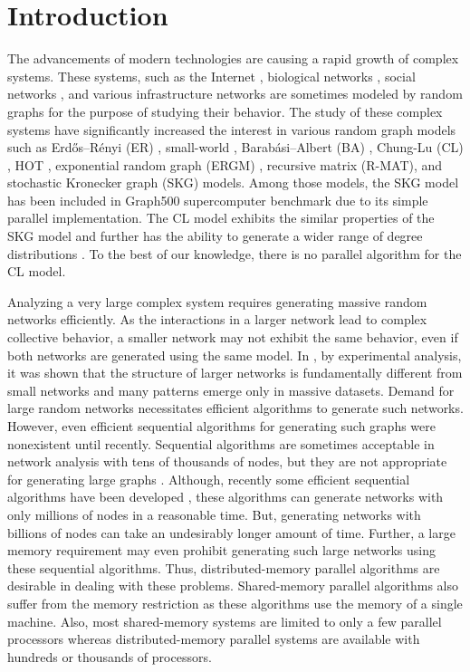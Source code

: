 \documentclass[conference,letterpaper,10pt]{IEEEtran}
\begin{document}
\IEEEpeerreviewmaketitle

\section{Introduction}
The advancements of modern technologies are causing a rapid growth of  complex systems. 
These systems, such as the Internet \cite{Siganos2003}, biological networks \cite{Girvan2002}, social networks \cite{Yang2011,Yang2012}, and various infrastructure networks \cite{Latora2005,Chassin2005}  are sometimes modeled by random graphs for the purpose of studying their behavior.
The study of these complex systems have significantly increased the interest in various random graph models such as Erd\H{o}s--R\'enyi (ER) \cite{Erdos1960}, small-world \cite{Watts1998}, Barab\'{a}si--Albert (BA) \cite{Barabasi1999}, Chung-Lu (CL) \cite{Chung2002}, HOT \cite{Carlson1999}, exponential random graph (ERGM) \cite{Robins2007}, recursive matrix (R-MAT)\cite{Chakrabarti2004}, and stochastic Kronecker graph (SKG) \cite{Leskovec2007,Leskovec2010} models. Among those models, the SKG model has been included in Graph500 supercomputer benchmark \cite{Graph500} due to its simple parallel implementation. The CL model exhibits the similar properties of the SKG model and further has the ability to generate a wider range of degree distributions \cite{Pinar2012}. To the best of our knowledge, there is no parallel algorithm for the CL model.

Analyzing a very large complex system requires generating massive random networks efficiently. As the interactions in a larger network lead to complex collective behavior, a smaller network may not exhibit the same behavior, even if both networks are generated using the same model. In \cite{Leskovec2008}, by experimental analysis, it was shown that the structure of larger networks is fundamentally different from small networks and many patterns emerge only in massive datasets.
Demand for large random networks necessitates efficient algorithms to generate such networks. However, even efficient sequential algorithms for generating such graphs were nonexistent until recently. 
Sequential algorithms are sometimes acceptable in network analysis with tens of thousands of nodes, but they are not appropriate for generating large graphs \cite{Batagelj2005}.
Although, recently some efficient sequential algorithms have been developed \cite{Chakrabarti2004,Batagelj2005,Leskovec2007,Miller2011}, these algorithms can generate networks with only millions of nodes in a reasonable time. But, generating networks with billions of nodes can take an undesirably longer amount of time. Further, a large memory requirement may even prohibit generating such large networks using these sequential algorithms. Thus, distributed-memory parallel algorithms are desirable in dealing with these problems. Shared-memory parallel algorithms also suffer from the memory restriction as these algorithms use the memory of a single machine. Also, most shared-memory systems are limited to only a few parallel processors whereas distributed-memory parallel systems are available with hundreds or thousands of processors.
\end{document}
